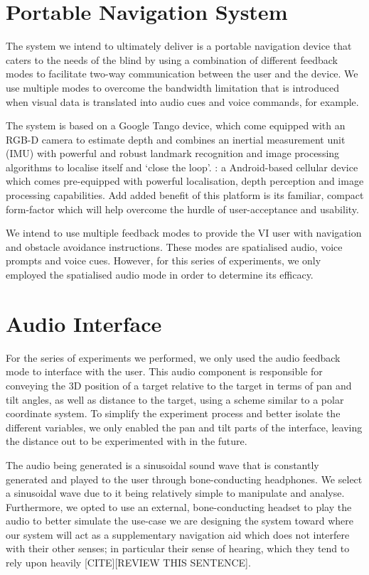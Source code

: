 \documentclass[format=sigconf, review=true, screen=true, anonymous=true]{acmart}
\begin{document}
\section{Portable Navigation System}

The system we intend to ultimately deliver is a portable navigation device that caters to the needs of the blind by using a combination of different feedback modes to facilitate two-way communication between the user and the device. We use multiple modes to overcome the bandwidth limitation that is introduced when visual data is translated into audio cues and voice commands, for example. 

The system is based on a Google Tango device, which come equipped with an RGB-D camera to estimate depth and combines an inertial measurement unit (IMU) with powerful and robust landmark recognition and image processing algorithms to localise itself and `close the loop'. : a Android-based cellular device which comes pre-equipped with powerful localisation, depth perception and image processing capabilities. Add added benefit of this platform is its familiar, compact form-factor which will help overcome the hurdle of user-acceptance and usability. 

We intend to use multiple feedback modes to provide the VI user with navigation and obstacle avoidance instructions. These modes are spatialised audio, voice prompts and voice cues. However, for this series of experiments, we only employed the spatialised audio mode in order to determine its efficacy. 

\section{Audio Interface}

For the series of experiments we performed, we only used the audio feedback mode to interface with the user. This audio component is responsible for conveying the 3D position of a target relative to the target in terms of pan and tilt angles, as well as distance to the target, using a scheme similar to a polar coordinate system. To simplify the experiment process and better isolate the different variables, we only enabled the pan and tilt parts of the interface, leaving the distance out to be experimented with in the future.  

The audio being generated is a sinusoidal sound wave that is constantly generated and played to the user through bone-conducting headphones. We select a sinusoidal wave due to it being relatively simple to manipulate and analyse. Furthermore, we opted to use an external, bone-conducting headset to play the audio to better simulate the use-case we are designing the system toward where our system will act as a supplementary navigation aid which does not interfere with their other senses; in particular their sense of hearing, which they tend to rely upon heavily [CITE][REVIEW THIS SENTENCE].
\end{document}
